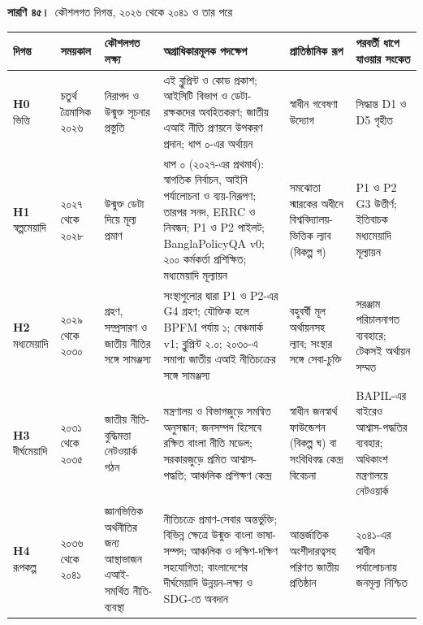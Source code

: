 \documentclass[border=10pt]{standalone}
\begin{document}
\begin{minipage}{22cm}
{\large\bfseries সারণি ৪৫।}\ {\large কৌশলগত দিগন্ত, ২০২৬ থেকে ২০৪১ ও তার পরে}\par\vspace{7pt}
\small
{}
\begin{tabularx}{\linewidth}{@{}>{\hsize=0.675\hsize\raggedright\arraybackslash}X>{\hsize=0.525\hsize\raggedright\arraybackslash}X>{\hsize=1.100\hsize\raggedright\arraybackslash}X>{\hsize=1.700\hsize\raggedright\arraybackslash}X>{\hsize=0.950\hsize\raggedright\arraybackslash}X>{\hsize=1.050\hsize\raggedright\arraybackslash}X@{}}
\arrayrulecolor{bapilrule}\toprule
\rowcolor{white}\textbf{দিগন্ত} & \textbf{সময়কাল} & \textbf{কৌশলগত লক্ষ্য} & \textbf{অগ্রাধিকারমূলক পদক্ষেপ} & \textbf{প্রাতিষ্ঠানিক রূপ} & \textbf{পরবর্তী ধাপে যাওয়ার সংকেত} \\
\midrule
\textbf{H0} ভিত্তি & চতুর্থ ত্রৈমাসিক ২০২৬ & নিরাপদ ও উন্মুক্ত সূচনার প্রস্তুতি & এই ব্লুপ্রিন্ট ও কোড প্রকাশ; আইসিটি বিভাগ ও ডেটা-রক্ষকদের অবহিতকরণ; জাতীয় এআই নীতি প্রণয়নে উপকরণ প্রদান; ধাপ ০-এর অর্থায়ন & স্বাধীন গবেষণা উদ্যোগ & সিদ্ধান্ত D1 ও D5 গৃহীত \\
\textbf{H1} স্বল্পমেয়াদি & ২০২৭ থেকে ২০২৮ & উন্মুক্ত ডেটা দিয়ে মূল্য প্রমাণ & ধাপ ০ (২০২৭-এর প্রথমার্ধ): স্বাগতিক নির্বাচন, আইনি পর্যালোচনা ও ব্যয়-নিরূপণ; তারপর সনদ, ERRC ও নিবন্ধন; P1 ও P2 পাইলট; BanglaPolicyQA v0; ২০০ কর্মকর্তা প্রশিক্ষিত; মধ্যমেয়াদি মূল্যায়ন & সমঝোতা স্মারকের অধীনে বিশ্ববিদ্যালয়-ভিত্তিক ল্যাব (বিকল্প গ) & P1 ও P2 G3 উত্তীর্ণ; ইতিবাচক মধ্যমেয়াদি মূল্যায়ন \\
\textbf{H2} মধ্যমেয়াদি & ২০২৯ থেকে ২০৩০ & গ্রহণ, সম্প্রসারণ ও জাতীয় নীতির সঙ্গে সামঞ্জস্য & সংস্থাগুলোর দ্বারা P1 ও P2-এর G4 গ্রহণ; যৌক্তিক হলে BPFM পর্যায় ১; বেঞ্চমার্ক v1; ব্লুপ্রিন্ট ২.০; ২০৩০-এ সমাপ্য জাতীয় এআই নীতিচক্রের সঙ্গে সামঞ্জস্য & বহুবর্ষী মূল অর্থায়নসহ ল্যাব; সংস্থার সঙ্গে সেবা-চুক্তি & সরঞ্জাম পরিচালনাগত ব্যবহারে; টেকসই অর্থায়ন সম্মত \\
\textbf{H3} দীর্ঘমেয়াদি & ২০৩১ থেকে ২০৩৫ & জাতীয় নীতি-বুদ্ধিমত্তা নেটওয়ার্ক গঠন & মন্ত্রণালয় ও বিভাগজুড়ে সমন্বিত অনুসন্ধান; জনসম্পদ হিসেবে রক্ষিত বাংলা নীতি মডেল; সরকারজুড়ে প্রমিত আশ্বাস-পদ্ধতি; আঞ্চলিক প্রশিক্ষণ কেন্দ্র & স্বাধীন জনস্বার্থ ফাউন্ডেশন (বিকল্প ঘ) বা সংবিধিবদ্ধ কেন্দ্র বিবেচনা & BAPIL-এর বাইরেও আশ্বাস-পদ্ধতির ব্যবহার; অধিকাংশ মন্ত্রণালয়ে নেটওয়ার্ক \\
\textbf{H4} রূপকল্প & ২০৩৬ থেকে ২০৪১ & জ্ঞানভিত্তিক অর্থনীতির জন্য আস্থাভাজন এআই-সমর্থিত নীতি-ব্যবস্থা & নীতিচক্রে প্রমাণ-সেবার অন্তর্ভুক্তি; বিভিন্ন ক্ষেত্রে উন্মুক্ত বাংলা ভাষা-সম্পদ; আঞ্চলিক ও দক্ষিণ-দক্ষিণ সহযোগিতা; বাংলাদেশের দীর্ঘমেয়াদি উন্নয়ন-লক্ষ্য ও SDG-তে অবদান & আন্তর্জাতিক অংশীদারত্বসহ পরিণত জাতীয় প্রতিষ্ঠান & ২০৪১-এর স্বাধীন পর্যালোচনায় জনমূল্য নিশ্চিত \\

\end{tabularx}
\end{minipage}
\end{document}
